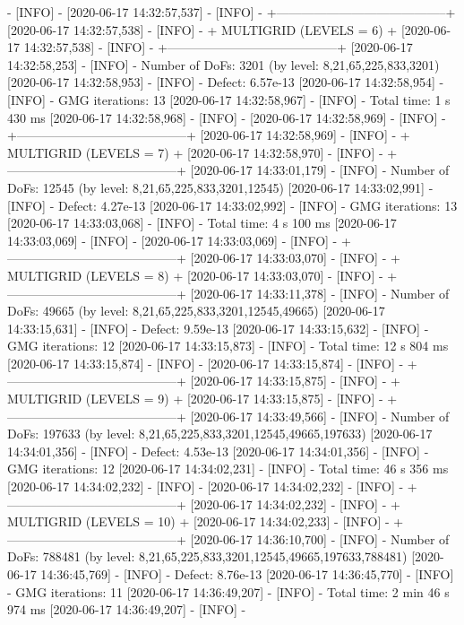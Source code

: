 \documentclass[letterpaper,10pt,english, openany]{sphinxmanual}
\begin{document}
{\begin{sphinxVerbatim}[commandchars=\\\{\}]
[2020-06-17 14:32:57,537] - [INFO] -
[2020-06-17 14:32:57,537] - [INFO] - +-----------------------------------------+
[2020-06-17 14:32:57,538] - [INFO] - +    MULTIGRID (LEVELS =  6)              +
[2020-06-17 14:32:57,538] - [INFO] - +-----------------------------------------+
[2020-06-17 14:32:58,253] - [INFO] - Number of DoFs: 3201 (by level: 8,21,65,225,833,3201)
[2020-06-17 14:32:58,953] - [INFO] - Defect:         6.57e-13
[2020-06-17 14:32:58,954] - [INFO] - GMG iterations: 13
[2020-06-17 14:32:58,967] - [INFO] - Total time:     1 s 430 ms
[2020-06-17 14:32:58,968] - [INFO] -
[2020-06-17 14:32:58,969] - [INFO] - +-----------------------------------------+
[2020-06-17 14:32:58,969] - [INFO] - +    MULTIGRID (LEVELS =  7)              +
[2020-06-17 14:32:58,970] - [INFO] - +-----------------------------------------+
[2020-06-17 14:33:01,179] - [INFO] - Number of DoFs: 12545 (by level: 8,21,65,225,833,3201,12545)
[2020-06-17 14:33:02,991] - [INFO] - Defect:         4.27e-13
[2020-06-17 14:33:02,992] - [INFO] - GMG iterations: 13
[2020-06-17 14:33:03,068] - [INFO] - Total time:     4 s 100 ms
[2020-06-17 14:33:03,069] - [INFO] -
[2020-06-17 14:33:03,069] - [INFO] - +-----------------------------------------+
[2020-06-17 14:33:03,070] - [INFO] - +    MULTIGRID (LEVELS =  8)              +
[2020-06-17 14:33:03,070] - [INFO] - +-----------------------------------------+
[2020-06-17 14:33:11,378] - [INFO] - Number of DoFs: 49665 (by level: 8,21,65,225,833,3201,12545,49665)
[2020-06-17 14:33:15,631] - [INFO] - Defect:         9.59e-13
[2020-06-17 14:33:15,632] - [INFO] - GMG iterations: 12
[2020-06-17 14:33:15,873] - [INFO] - Total time:     12 s 804 ms
[2020-06-17 14:33:15,874] - [INFO] -
[2020-06-17 14:33:15,874] - [INFO] - +-----------------------------------------+
[2020-06-17 14:33:15,875] - [INFO] - +    MULTIGRID (LEVELS =  9)              +
[2020-06-17 14:33:15,875] - [INFO] - +-----------------------------------------+
[2020-06-17 14:33:49,566] - [INFO] - Number of DoFs: 197633 (by level: 8,21,65,225,833,3201,12545,49665,197633)
[2020-06-17 14:34:01,356] - [INFO] - Defect:         4.53e-13
[2020-06-17 14:34:01,356] - [INFO] - GMG iterations: 12
[2020-06-17 14:34:02,231] - [INFO] - Total time:     46 s 356 ms
[2020-06-17 14:34:02,232] - [INFO] -
[2020-06-17 14:34:02,232] - [INFO] - +-----------------------------------------+
[2020-06-17 14:34:02,232] - [INFO] - +    MULTIGRID (LEVELS = 10)              +
[2020-06-17 14:34:02,233] - [INFO] - +-----------------------------------------+
[2020-06-17 14:36:10,700] - [INFO] - Number of DoFs: 788481 (by level: 8,21,65,225,833,3201,12545,49665,197633,788481)
[2020-06-17 14:36:45,769] - [INFO] - Defect:         8.76e-13
[2020-06-17 14:36:45,770] - [INFO] - GMG iterations: 11
[2020-06-17 14:36:49,207] - [INFO] - Total time:     2 min 46 s 974 ms
[2020-06-17 14:36:49,207] - [INFO] -
\end{sphinxVerbatim}
}
\end{document}
